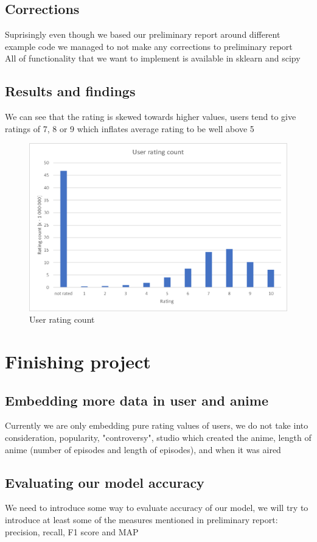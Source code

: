\documentclass[12pt]{article}
\begin{document}
\subsection{Corrections}
Suprisingly even though we based our preliminary report around different example code we managed to not make any corrections to preliminary report \\ 
All of functionality that we want to implement is available in sklearn and scipy 
\subsection{Results and findings}
We can see that the rating is skewed towards higher values, users tend to give ratings of 7, 8 or 9 which inflates average rating to be well above 5
\begin{figure}
  \caption{User rating count}
  \includegraphics[width=\textwidth]{user_rating.png}
\end{figure}
\section{Finishing project}
\subsection{Embedding more data in user and anime}
Currently we are only embedding pure rating values of users, we do not take into consideration, popularity, "controversy", studio which created the anime, length of anime (number of episodes and length of episodes), and when it was aired \\ 
\subsection{Evaluating our model accuracy}
We need to introduce some way to evaluate accuracy of our model, we will try to introduce at least some of the measures mentioned in preliminary report: precision, recall, F1 score and MAP
\end{document}
